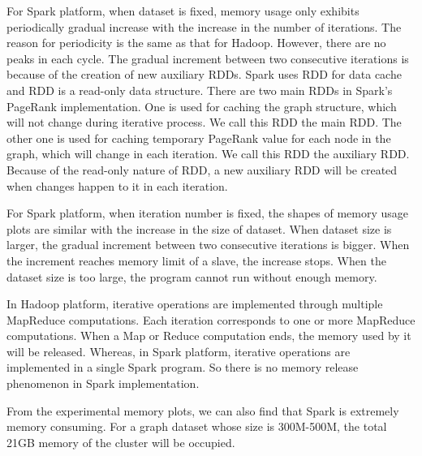 \documentclass[12pt,conference,letterpaper]{IEEEtran}
\begin{document}
For Spark platform, when dataset is fixed, memory usage only exhibits periodically gradual increase with the increase in the number of iterations. The reason for periodicity is the same as that for Hadoop. However, there are no peaks in each cycle. The gradual increment between two consecutive iterations is because of the creation of new auxiliary RDDs. Spark uses RDD for data cache and RDD is a read-only data structure. There are two main RDDs in Spark's PageRank implementation. One is used for caching the graph structure, which will not change during iterative process. We call this RDD the main RDD. The other one is used for caching temporary PageRank value for each node in the graph, which will change in each iteration. We call this RDD the auxiliary RDD. Because of the read-only nature of RDD, a new auxiliary RDD will be created when changes happen to it in each iteration.

For Spark platform, when iteration number is fixed, the shapes of memory usage plots are similar with the increase in the size of dataset. When dataset size is larger, the gradual increment between two consecutive iterations is bigger. When the increment reaches memory limit of a slave, the increase stops. When the dataset size is too large, the program cannot run without enough memory.

In Hadoop platform, iterative operations are implemented through multiple MapReduce computations. Each iteration corresponds to one or more MapReduce computations. When a Map or Reduce computation ends, the memory used by it will be released. Whereas, in Spark platform, iterative operations are implemented in a single Spark program. So there is no memory release phenomenon in Spark implementation. 

From the experimental memory plots, we can also find that Spark is extremely memory consuming. For a graph dataset whose size is 300M-500M, the total 21GB memory of the cluster will be occupied. 


\end{document}
